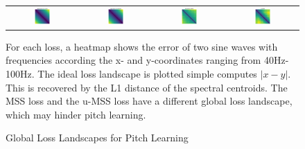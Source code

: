 \begin{theappendices}
\begin{figure}
    \begin{tabular}{cccc}
        \includegraphics[width=0.24\textwidth]{figures/pitch_learning/global/ideal_l1.png} &
        \includegraphics[width=0.24\textwidth]{figures/pitch_learning/global/spectral_centroid.png} &
        \includegraphics[width=0.24\textwidth]{figures/pitch_learning/global/mss.png} &
        \includegraphics[width=0.24\textwidth]{figures/pitch_learning/global/umss.png} \\
    \end{tabular}
    \caption{Global Loss Landscapes for Pitch Learning}
    \label{fig:global-loss-landscape}
    \small{For each loss, a heatmap shows the error of two sine waves with frequencies according the x- and y-coordinates ranging from 40Hz-100Hz. The ideal loss landscape is plotted simple computes $|x - y|$. This is recovered by the L1 distance of the spectral centroids. The MSS loss and the u-MSS loss have a different global loss landscape, which may hinder pitch learning.}
\end{figure}



\end{theappendices}
